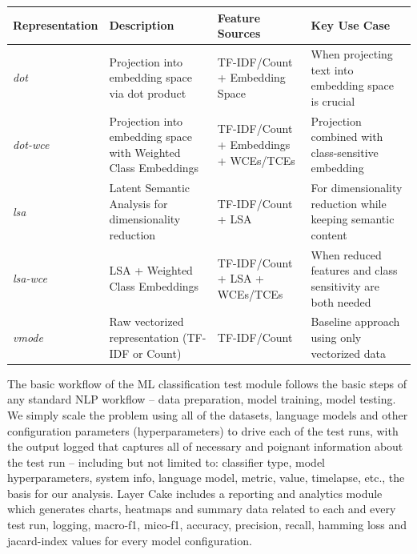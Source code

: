 \documentclass[final]{clv2025}
\begin{document}
\sloppy
\begin{table}[h!]

\label{tab1}
\begin{tabularx}{\textwidth}{|l|X|X|X|}
\toprule
\textbf{Representation} & \textbf{Description} & \textbf{Feature Sources} & \textbf{Key Use Case} \\
\midrule

\textit{dot} & Projection into embedding space via dot product & TF-IDF/Count + Embedding Space & When projecting text into embedding space is crucial \\
\textit{dot-wce} & Projection into embedding space with Weighted Class Embeddings & TF-IDF/Count + Embeddings + WCEs/TCEs & Projection combined with class-sensitive embedding \\
\textit{lsa} & Latent Semantic Analysis for dimensionality reduction & TF-IDF/Count + LSA & For dimensionality reduction while keeping semantic content \\
\textit{lsa-wce} & LSA + Weighted Class Embeddings & TF-IDF/Count + LSA + WCEs/TCEs & When reduced features and class sensitivity are both needed \\
\textit{vmode} & Raw vectorized representation (TF-IDF or Count) & TF-IDF/Count & Baseline approach using only vectorized data \\

\bottomrule
\end{tabularx}
\end{table}
The basic workflow of the ML classification test module follows the basic steps of any standard NLP workflow – data preparation, model training, model testing. We simply scale the problem using all of the datasets, language models and other configuration parameters (hyperparameters) to drive each of the test runs, with the output logged that captures all of necessary and poignant information about the test run – including but not limited to: classifier type, model hyperparameters, system info, language model, metric, value, timelapse, etc., the basis for our analysis. Layer Cake includes a reporting and analytics module which generates charts, heatmaps and summary data related to each and every test run, logging, macro-f1, mico-f1, accuracy, precision, recall, hamming loss and jacard-index values for every model configuration. 
\end{document}
